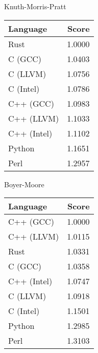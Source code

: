 \begin{subtable}{0.33\textwidth}
    \centering
    \caption{Knuth-Morris-Pratt}
    \label{table:energy:kmp}
    \begin{tabular}{|l|r|}
        \hline
        Language & Score \\
        \hline
        Rust & 1.0000 \\
        C (GCC) & 1.0403 \\
        C (LLVM) & 1.0756 \\
        C (Intel) & 1.0786 \\
        C++ (GCC) & 1.0983 \\
        C++ (LLVM) & 1.1033 \\
        C++ (Intel) & 1.1102 \\
        Python & 1.1651 \\
        Perl & 1.2957 \\
        \hline
    \end{tabular}
\end{subtable}%
\begin{subtable}{0.33\textwidth}
    \centering
    \caption{Boyer-Moore}
    \label{table:energy:boyer_moore}
    \begin{tabular}{|l|r|}
        \hline
        Language & Score \\
        \hline
        C++ (GCC) & 1.0000 \\
        C++ (LLVM) & 1.0115 \\
        Rust & 1.0331 \\
        C (GCC) & 1.0358 \\
        C++ (Intel) & 1.0747 \\
        C (LLVM) & 1.0918 \\
        C (Intel) & 1.1501 \\
        Python & 1.2985 \\
        Perl & 1.3103 \\
        \hline
    \end{tabular}
\end{subtable}%
